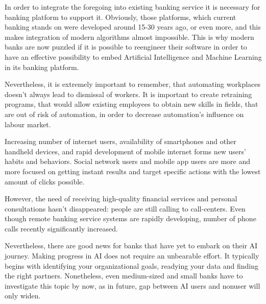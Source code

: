 In order to integrate the foregoing into existing banking service it is necessary for banking platform to support it.
Obviously, those platforms, which current banking stands on were developed around 15-30 years ago, or even more, and this makes integration of modern algorithms almost impossible. 
This is why modern banks are now puzzled if it is possible to reengineer their software in order to have an effective possibility to embed Artificial Intelligence and Machine Learning in its banking platform.

Nevertheless, it is extremely important to remember, that automating workplaces doesn't always lead to dismissal of workers.
It is important to create retraining programs, that would allow existing employees to obtain new skills in fields,
that are out of risk of automation, in order to decrease automation's influence on labour market.

Increasing number of internet users, availability of smartphones and other handheld devices, and rapid development of mobile internet forms new users' habits and behaviors.
Social network users and mobile app users are more and more focused on getting instant results and target specific actions with the lowest amount of clicks possible.

However, the need of receiving high-quality financial services and personal consultations hasn't disappeared: people are still calling to call-centers.
Even though remote banking service systems are rapidly developing, number of phone calls recently significantly increased. 

Nevertheless, there are good news for banks that have yet to embark on their AI journey. 
Making progress in AI does not require an unbearable effort.
It typically begins with identifying your organizational goals, readying your data and finding the right partners.
Nonetheless, even medium-sized and small banks have to investigate this topic by now, as in future, gap between AI users and nonuser will only widen.





